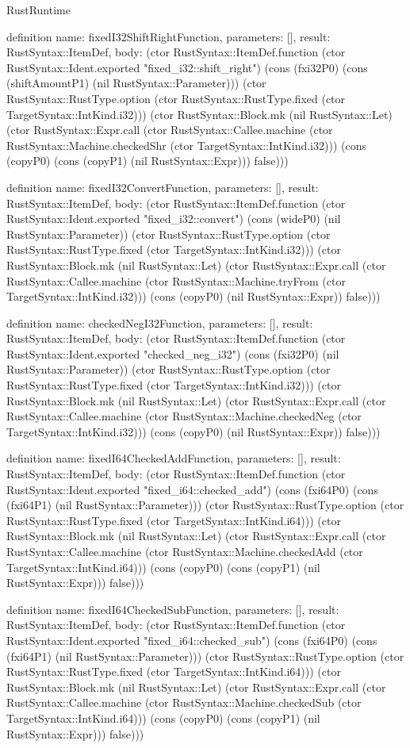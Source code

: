 \begin{lexlean}{RustRuntime}
\begin{semanticmodule}
definition{
  name: fixedI32ShiftRightFunction,
  parameters: [],
  result: RustSyntax::ItemDef,
  body: (ctor RustSyntax::ItemDef.function (ctor RustSyntax::Ident.exported "fixed_i32::shift_right") (cons (fxi32P0) (cons (shiftAmountP1) (nil RustSyntax::Parameter))) (ctor RustSyntax::RustType.option (ctor RustSyntax::RustType.fixed (ctor TargetSyntax::IntKind.i32))) (ctor RustSyntax::Block.mk (nil RustSyntax::Let) (ctor RustSyntax::Expr.call (ctor RustSyntax::Callee.machine (ctor RustSyntax::Machine.checkedShr (ctor TargetSyntax::IntKind.i32))) (cons (copyP0) (cons (copyP1) (nil RustSyntax::Expr))) false)))
}

definition{
  name: fixedI32ConvertFunction,
  parameters: [],
  result: RustSyntax::ItemDef,
  body: (ctor RustSyntax::ItemDef.function (ctor RustSyntax::Ident.exported "fixed_i32::convert") (cons (wideP0) (nil RustSyntax::Parameter)) (ctor RustSyntax::RustType.option (ctor RustSyntax::RustType.fixed (ctor TargetSyntax::IntKind.i32))) (ctor RustSyntax::Block.mk (nil RustSyntax::Let) (ctor RustSyntax::Expr.call (ctor RustSyntax::Callee.machine (ctor RustSyntax::Machine.tryFrom (ctor TargetSyntax::IntKind.i32))) (cons (copyP0) (nil RustSyntax::Expr)) false)))
}

definition{
  name: checkedNegI32Function,
  parameters: [],
  result: RustSyntax::ItemDef,
  body: (ctor RustSyntax::ItemDef.function (ctor RustSyntax::Ident.exported "checked_neg_i32") (cons (fxi32P0) (nil RustSyntax::Parameter)) (ctor RustSyntax::RustType.option (ctor RustSyntax::RustType.fixed (ctor TargetSyntax::IntKind.i32))) (ctor RustSyntax::Block.mk (nil RustSyntax::Let) (ctor RustSyntax::Expr.call (ctor RustSyntax::Callee.machine (ctor RustSyntax::Machine.checkedNeg (ctor TargetSyntax::IntKind.i32))) (cons (copyP0) (nil RustSyntax::Expr)) false)))
}

definition{
  name: fixedI64CheckedAddFunction,
  parameters: [],
  result: RustSyntax::ItemDef,
  body: (ctor RustSyntax::ItemDef.function (ctor RustSyntax::Ident.exported "fixed_i64::checked_add") (cons (fxi64P0) (cons (fxi64P1) (nil RustSyntax::Parameter))) (ctor RustSyntax::RustType.option (ctor RustSyntax::RustType.fixed (ctor TargetSyntax::IntKind.i64))) (ctor RustSyntax::Block.mk (nil RustSyntax::Let) (ctor RustSyntax::Expr.call (ctor RustSyntax::Callee.machine (ctor RustSyntax::Machine.checkedAdd (ctor TargetSyntax::IntKind.i64))) (cons (copyP0) (cons (copyP1) (nil RustSyntax::Expr))) false)))
}

definition{
  name: fixedI64CheckedSubFunction,
  parameters: [],
  result: RustSyntax::ItemDef,
  body: (ctor RustSyntax::ItemDef.function (ctor RustSyntax::Ident.exported "fixed_i64::checked_sub") (cons (fxi64P0) (cons (fxi64P1) (nil RustSyntax::Parameter))) (ctor RustSyntax::RustType.option (ctor RustSyntax::RustType.fixed (ctor TargetSyntax::IntKind.i64))) (ctor RustSyntax::Block.mk (nil RustSyntax::Let) (ctor RustSyntax::Expr.call (ctor RustSyntax::Callee.machine (ctor RustSyntax::Machine.checkedSub (ctor TargetSyntax::IntKind.i64))) (cons (copyP0) (cons (copyP1) (nil RustSyntax::Expr))) false)))
}


\end{semanticmodule}
\end{lexlean}
